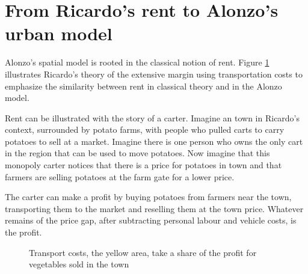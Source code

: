 
\section{From Ricardo's rent to Alonzo's urban model} 

Alonzo's spatial model is rooted in the classical notion of rent. 
Figure \ref{fig-rent-ricardo} illustrates Ricardo's theory of the extensive margin using transportation costs to emphasize the similarity between rent in classical theory and in the Alonzo model. 


Rent  can be illustrated with the story of a carter.
Imagine an  town in Ricardo's context, surrounded by potato farms, with people who pulled carts to carry potatoes to sell at a market. 
Imagine there is one person who owns the only cart in the region that can be used to move potatoes. Now imagine that this monopoly carter notices that there is a price for potatoes in town and that farmers are selling potatoes at the farm gate for a lower price. 

The carter can make a profit by buying potatoes from farmers near the town, transporting them to the market and reselling them at the town price. Whatever remains of the price gap, after subtracting personal labour and vehicle costs, is the profit.  

\begin{figure}[htb]
    \begin{center}
    
    \caption{Transport costs, the yellow area, take a share of the profit for vegetables sold in the town}
    \label{fig-rent-ricardo}
    \end{center}
\end{figure}

